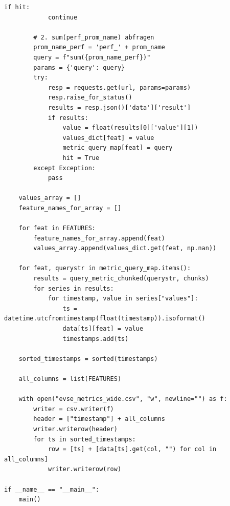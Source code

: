 \begin{lstlisting}[caption={Python script for scraping performance monitoring from Prometheus into an csv file}, label={lst:prometheustocsv_scraper}]
        if hit:
            continue

        # 2. sum(perf_prom_name) abfragen
        prom_name_perf = 'perf_' + prom_name
        query = f"sum({prom_name_perf})"
        params = {'query': query}
        try:
            resp = requests.get(url, params=params)
            resp.raise_for_status()
            results = resp.json()['data']['result']
            if results:
                value = float(results[0]['value'][1])
                values_dict[feat] = value
                metric_query_map[feat] = query
                hit = True
        except Exception:
            pass

    values_array = []
    feature_names_for_array = []

    for feat in FEATURES:
        feature_names_for_array.append(feat)
        values_array.append(values_dict.get(feat, np.nan))

    for feat, querystr in metric_query_map.items():
        results = query_metric_chunked(querystr, chunks)
        for series in results:
            for timestamp, value in series["values"]:
                ts = datetime.utcfromtimestamp(float(timestamp)).isoformat()
                data[ts][feat] = value
                timestamps.add(ts)

    sorted_timestamps = sorted(timestamps)

    all_columns = list(FEATURES)

    with open("evse_metrics_wide.csv", "w", newline="") as f:
        writer = csv.writer(f)
        header = ["timestamp"] + all_columns
        writer.writerow(header)
        for ts in sorted_timestamps:
            row = [ts] + [data[ts].get(col, "") for col in all_columns]
            writer.writerow(row)

if __name__ == "__main__":
    main()
\end{lstlisting}

